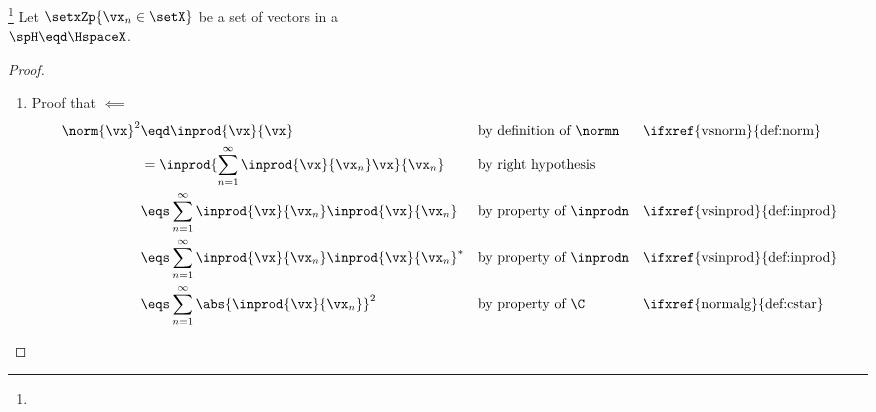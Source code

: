\begin{proposition}
\footnote{
  }
\label{prop:parseval_reconstruction}
Let $\setxZp{\vx_n\in\setX}$ be a set of vectors in a  \\
$\spH\eqd\HspaceX$.
\end{proposition}
\begin{proof}
\begin{enumerate}
  \item Proof that  $\impliedby$   
    \begin{align*}
      \norm{\vx}^2
        &\eqd \inprod{\vx}{\vx}
        && \text{by definition of $\normn$}
        && \text{\ifxref{vsnorm}{def:norm}}
      \\&= \inprod{\sum_{n=1}^\infty \inprod{\vx}{\vx_n}\vx}{\vx_n}
        && \text{by right hypothesis}
      \\&\eqs\sum_{n=1}^\infty \inprod{\vx}{\vx_n}\inprod{\vx}{\vx_n}
        && \text{by property of $\inprodn$}
        && \text{\ifxref{vsinprod}{def:inprod}}
      \\&\eqs\sum_{n=1}^\infty \inprod{\vx}{\vx_n}\inprod{\vx}{\vx_n}^\ast
        && \text{by property of $\inprodn$}
        && \text{\ifxref{vsinprod}{def:inprod}}
      \\&\eqs\sum_{n=1}^\infty \abs{\inprod{\vx}{\vx_n}}^2
        && \text{by property of $\C$}
        && \text{\ifxref{normalg}{def:cstar}}
    \end{align*}


\end{enumerate}
\end{proof}
